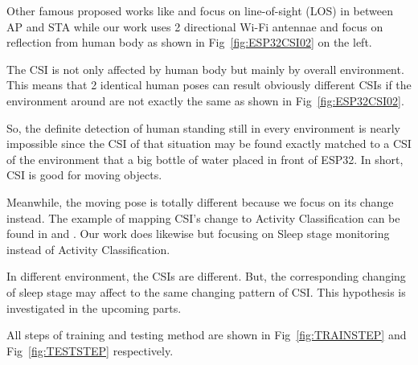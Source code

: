 \documentclass[10pt,letterpaper]{article}
\begin{document}
	Other famous proposed works like \cite{wangF} \cite{liuJ} and \cite{hernandezSM} focus on line-of-sight (LOS) in between AP and STA while our work uses 2 directional Wi-Fi antennae and focus on reflection from human body as shown in Fig~\ref{fig:ESP32CSI02} on the left.
	
	
	The CSI is not only affected by human body but mainly by overall environment. This means that 2 identical human poses can result obviously different CSIs if the environment around are not exactly the same as shown in Fig~\ref{fig:ESP32CSI02}.
	
	
	So, the definite detection of human standing still in every environment is nearly impossible since the CSI of that situation may be found exactly matched to a CSI of the environment that a big bottle of water placed in front of ESP32.
	In short, CSI is good for moving objects.
	
	Meanwhile, the moving pose is totally different because we focus on its change instead. The example of mapping CSI's change to Activity Classification can be found in \cite{chowdhuryTZ} and \cite{zouH}. Our work does likewise but focusing on Sleep stage monitoring instead of Activity Classification.
	
	In different environment, the CSIs are different. But, the corresponding changing of sleep stage may affect to the same changing pattern of CSI. This hypothesis is investigated in the upcoming parts.
	
	All steps of training and testing method are shown in Fig~\ref{fig:TRAINSTEP} and Fig~\ref{fig:TESTSTEP} respectively. 
	
\end{document}
